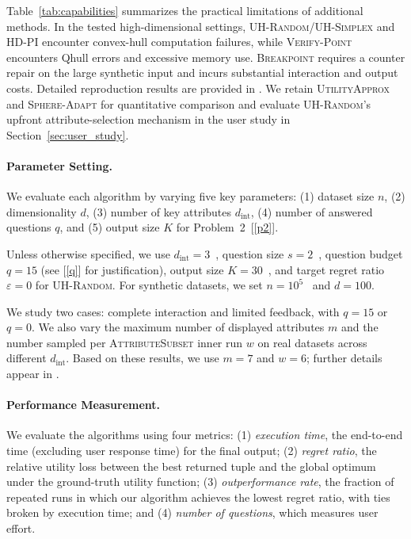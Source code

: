 Table~\ref{tab:capabilities} summarizes the practical limitations of additional methods. In the tested high-dimensional settings, \textsc{UH-Random}/\textsc{UH-Simplex} and \textsc{HD-PI} encounter convex-hull computation failures, while \textsc{Verify-Point} encounters Qhull errors and excessive memory use. \textsc{Breakpoint} requires a counter repair on the large synthetic input and incurs substantial interaction and output costs. Detailed reproduction results are provided in \iftoggle{TechnicalReport}{Section~\ref{appen:capabilities} of the \technicalreport}{Appendix~\ref{appen:capabilities}}. We retain \textsc{UtilityApprox} and \textsc{Sphere-Adapt} for quantitative comparison and evaluate \textsc{UH-Random}’s upfront attribute-selection mechanism in the user study in Section~\ref{sec:user_study}.

\paragraph{\textbf{Parameter Setting. }}
We evaluate each algorithm by varying five key parameters: (1) dataset size $n$, (2) dimensionality $d$, (3) number of key attributes $d_\text{int}$, (4) number of answered questions $q$, and (5) output size $K$ for Problem~2~[\ref{p2}].

Unless otherwise specified, we use $d_\text{int}=3$~\cite{GG96, GA12, WX22, SC05, TK03, DMW12}, question size $s=2$~\cite{NL12}, question budget $q=15$ (see [\ref{q}] for justification), output size $K=30$~\cite{XW18}, and target regret ratio $\varepsilon=0$ for \textsc{UH-Random}. For synthetic datasets, we set $n=10^5$~\cite{NL12, WWX21, XCL19, XW18} and $d=100$.

We study two cases: complete interaction and limited feedback, with $q=15$ or $q=0$. We also vary the maximum number of displayed attributes $m$ and the number sampled per \textsc{AttributeSubset} inner run $w$ on real datasets across different $d_\text{int}$. Based on these results, we use $m=7$ and $w=6$; further details appear in \iftoggle{TechnicalReport}{Section~\ref{appen:setting} of the \technicalreport}{Appendix~\ref{appen:setting}}.

\paragraph{\textbf{Performance Measurement. }}
We evaluate the algorithms using four metrics: (1) \textit{execution time}, the end-to-end time (excluding user response time) for the final output; (2) \textit{regret ratio}, the relative utility loss between the best returned tuple and the global optimum under the ground-truth utility function; (3) \textit{outperformance rate}, the fraction of repeated runs in which our algorithm achieves the lowest regret ratio, with ties broken by execution time; and (4) \textit{number of questions}, which measures user effort.

